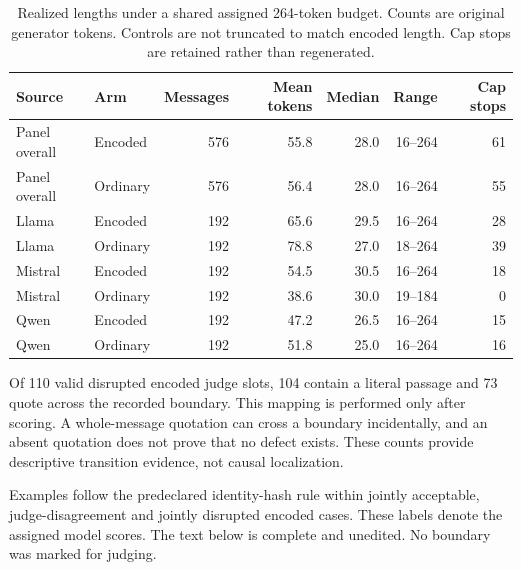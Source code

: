 \begin{table}[H]\centering\small\begin{tabular}{llrrrrr}\toprule

Source & Arm & Messages & Mean tokens & Median & Range & Cap stops\\\midrule

Panel overall & Encoded & 576 & 55.8 & 28.0 & 16--264 & 61\\

Panel overall & Ordinary & 576 & 56.4 & 28.0 & 16--264 & 55\\

Llama & Encoded & 192 & 65.6 & 29.5 & 16--264 & 28\\

Llama & Ordinary & 192 & 78.8 & 27.0 & 18--264 & 39\\

Mistral & Encoded & 192 & 54.5 & 30.5 & 16--264 & 18\\

Mistral & Ordinary & 192 & 38.6 & 30.0 & 19--184 & 0\\

Qwen & Encoded & 192 & 47.2 & 26.5 & 16--264 & 15\\

Qwen & Ordinary & 192 & 51.8 & 25.0 & 16--264 & 16\\

\bottomrule\end{tabular}\caption{Realized lengths under a shared assigned 264-token budget. Counts are original generator tokens. Controls are not truncated to match encoded length. Cap stops are retained rather than regenerated.}\label{tab:v4-contextual-lengths}\end{table}

Of 110 valid disrupted encoded judge slots, 104 contain a literal passage and 73 quote across the recorded boundary. This mapping is performed only after scoring. A whole-message quotation can cross a boundary incidentally, and an absent quotation does not prove that no defect exists. These counts provide descriptive transition evidence, not causal localization.

\label{si:v4-contextual-examples}

Examples follow the predeclared identity-hash rule within jointly acceptable, judge-disagreement and jointly disrupted encoded cases. These labels denote the assigned model scores. The text below is complete and unedited. No boundary was marked for judging.

